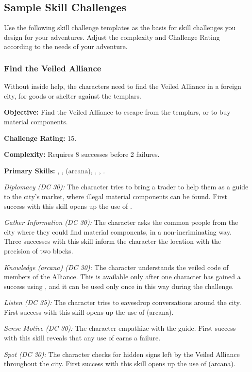 \subsection{Sample Skill Challenges}
Use the following skill challenge templates as the basis for skill challenges you design for your adventures. Adjust the complexity and Challenge Rating according to the needs of your adventure.

\subsubsection{Find the Veiled Alliance}
Without inside help, the characters need to find the Veiled Alliance in a foreign city, for goods or shelter against the templars.

\textbf{Objective:} Find the Veiled Alliance to escape from the templars, or to buy material components.

\textbf{Challenge Rating:} 15.

\textbf{Complexity:} Requires 8 successes before 2 failures.

\textbf{Primary Skills:} , ,  (arcana), , , .

\textit{Diplomacy (DC 30):} The character tries to bring a trader to help them as a guide to the city's market, where illegal material components can be found. First success with this skill opens up the use of .

\textit{Gather Information (DC 30):} The character asks the common people from the city where they could find material components, in a non-incriminating way. Three successes with this skill inform the character the location with the precision of two blocks.

\textit{Knowledge (arcana) (DC 30):} The character understands the veiled code of members of the Alliance. This is available only after one character has gained a success using , and it can be used only once in this way during the challenge.

\textit{Listen (DC 35):} The character tries to eavesdrop conversations around the city. First success with this skill opens up the use of  (arcana).

\textit{Sense Motive (DC 30):} The character empathize with the guide. First success with this skill reveals that any use of  earns a failure.

\textit{Spot (DC 30):} The character checks for hidden signs left by the Veiled Alliance throughout the city. First success with this skill opens up the use of  (arcana).

